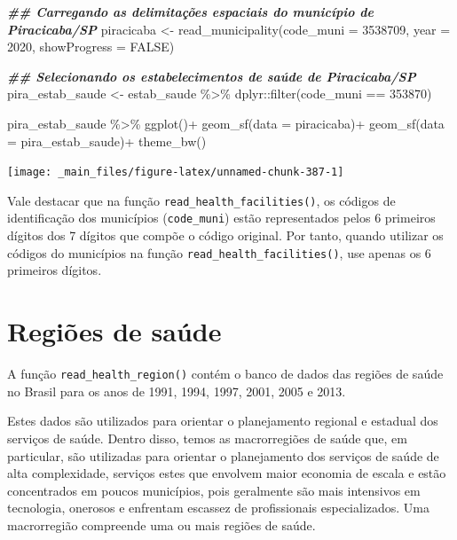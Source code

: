 \documentclass[
  brazilian,
]{book}
\newenvironment{Shaded}{\begin{snugshade}}{\end{snugshade}}
\newcommand{\AttributeTok}[1]{\textcolor[rgb]{0.77,0.63,0.00}{#1}}
\newcommand{\ConstantTok}[1]{\textcolor[rgb]{0.00,0.00,0.00}{#1}}
\newcommand{\DecValTok}[1]{\textcolor[rgb]{0.00,0.00,0.81}{#1}}
\newcommand{\DocumentationTok}[1]{\textcolor[rgb]{0.56,0.35,0.01}{\textbf{\textit{#1}}}}
\newcommand{\FunctionTok}[1]{\textcolor[rgb]{0.00,0.00,0.00}{#1}}
\newcommand{\NormalTok}[1]{#1}
\newcommand{\OtherTok}[1]{\textcolor[rgb]{0.56,0.35,0.01}{#1}}
\newcommand{\SpecialCharTok}[1]{\textcolor[rgb]{0.00,0.00,0.00}{#1}}
\begin{document}
\begin{Shaded}
\begin{Highlighting}[]
\DocumentationTok{\#\# Carregando as delimitações espaciais do município de Piracicaba/SP}
\NormalTok{piracicaba }\OtherTok{\textless{}{-}} \FunctionTok{read\_municipality}\NormalTok{(}\AttributeTok{code\_muni =} \DecValTok{3538709}\NormalTok{,}
                                \AttributeTok{year =} \DecValTok{2020}\NormalTok{,}
                                \AttributeTok{showProgress =} \ConstantTok{FALSE}\NormalTok{)}

\DocumentationTok{\#\# Selecionando os estabelecimentos de saúde de Piracicaba/SP}
\NormalTok{pira\_estab\_saude }\OtherTok{\textless{}{-}}\NormalTok{ estab\_saude }\SpecialCharTok{\%\textgreater{}\%} 
\NormalTok{  dplyr}\SpecialCharTok{::}\FunctionTok{filter}\NormalTok{(code\_muni }\SpecialCharTok{==} \DecValTok{353870}\NormalTok{)}

\NormalTok{pira\_estab\_saude }\SpecialCharTok{\%\textgreater{}\%} 
  \FunctionTok{ggplot}\NormalTok{()}\SpecialCharTok{+}
  \FunctionTok{geom\_sf}\NormalTok{(}\AttributeTok{data =}\NormalTok{ piracicaba)}\SpecialCharTok{+}
  \FunctionTok{geom\_sf}\NormalTok{(}\AttributeTok{data =}\NormalTok{ pira\_estab\_saude)}\SpecialCharTok{+}
  \FunctionTok{theme\_bw}\NormalTok{()}
\end{Highlighting}
\end{Shaded}

\begin{center}\texttt{[image: \_main\_files/figure-latex/unnamed-chunk-387-1]} \end{center}

Vale destacar que na função \texttt{read\_health\_facilities()}, os códigos de identificação dos municípios (\texttt{code\_muni}) estão representados pelos 6 primeiros dígitos dos 7 dígitos que compõe o código original. Por tanto, quando utilizar os códigos do municípios na função \texttt{read\_health\_facilities()}, use apenas os 6 primeiros dígitos.

\hypertarget{regiuxf5es-de-sauxfade}{%
\section{Regiões de saúde}\label{regiuxf5es-de-sauxfade}}

A função \texttt{read\_health\_region()} contém o banco de dados das regiões de saúde no Brasil para os anos de 1991, 1994, 1997, 2001, 2005 e 2013.

Estes dados são utilizados para orientar o planejamento regional e estadual dos serviços de saúde. Dentro disso, temos as macrorregiões de saúde que, em particular, são utilizadas para orientar o planejamento dos serviços de saúde de alta complexidade, serviços estes que envolvem maior economia de escala e estão concentrados em poucos municípios, pois geralmente são mais intensivos em tecnologia, onerosos e enfrentam escassez de profissionais especializados. Uma macrorregião compreende uma ou mais regiões de saúde.
\end{document}
